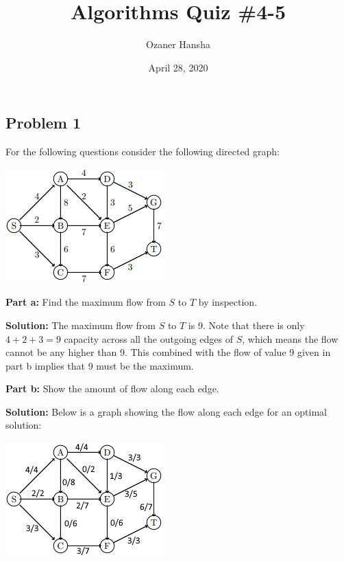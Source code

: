 \documentclass{article}
\begin{document}
\setlength{\droptitle}{-7em}   %

\title{Algorithms Quiz \#4-5}
\author{Ozaner Hansha}
\date{April 28, 2020}
\maketitle

\subsection*{Problem 1}
For the following questions consider the following directed graph:
\begin{center}
  \includegraphics{graph.png}
\end{center}

\noindent\textbf{Part a:} Find the maximum flow from $S$ to $T$ by inspection.
\bigskip

\noindent\textbf{Solution:} The maximum flow from $S$ to $T$ is 9. Note that there is only $4+2+3=9$ capacity across all the outgoing edges of $S$, which means the flow cannot be any higher than 9. This combined with the flow of value 9 given in part b implies that 9 must be the maximum.
\bigskip

\noindent\textbf{Part b:} Show the amount of flow along each edge.
\bigskip

\noindent\textbf{Solution:} Below is a graph showing the flow along each edge for an optimal solution:
\begin{center}
  \includegraphics{graphFlow.png}
\end{center}
\bigskip
\newpage
\end{document}
